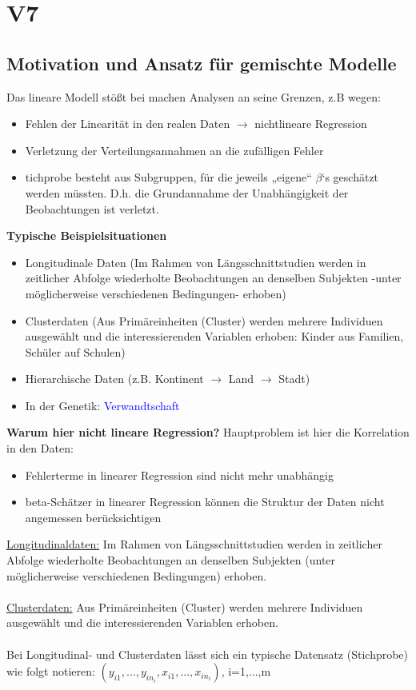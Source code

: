 \section{V7}
\subsection{Motivation und Ansatz für gemischte Modelle}
Das lineare Modell stößt bei machen Analysen an seine Grenzen, z.B wegen:
\begin{itemize}
	\item Fehlen der Linearität in den realen Daten $\rightarrow$ nichtlineare Regression
	\item Verletzung der Verteilungsannahmen an die zufälligen Fehler
	\item tichprobe besteht aus Subgruppen, für die jeweils „eigene“ $\beta$‘s geschätzt werden müssten. D.h. die Grundannahme der Unabhängigkeit der Beobachtungen ist verletzt.
\end{itemize}

\textbf{Typische Beispielsituationen}
\begin{itemize}
	\item Longitudinale Daten (Im Rahmen von Längsschnittstudien werden in zeitlicher Abfolge wiederholte Beobachtungen an denselben Subjekten -unter möglicherweise verschiedenen Bedingungen- erhoben)
	\item Clusterdaten (Aus Primäreinheiten (Cluster) werden mehrere Individuen ausgewählt und die interessierenden Variablen erhoben: Kinder aus Familien, Schüler auf Schulen)
	\item Hierarchische Daten (z.B. Kontinent $\rightarrow$ Land $\rightarrow$ Stadt)
	\item In der Genetik: \textcolor{blue}{Verwandtschaft}
\end{itemize}

\textbf{Warum hier nicht lineare Regression?}
Hauptproblem ist hier die Korrelation in den Daten:
\begin{itemize}
	\item Fehlerterme in linearer Regression sind nicht mehr unabhängig
	\item beta-Schätzer in linearer Regression können die Struktur der Daten nicht angemessen berücksichtigen
\end{itemize}

\underline{Longitudinaldaten:} Im Rahmen von Längsschnittstudien werden in zeitlicher Abfolge wiederholte Beobachtungen an denselben Subjekten (unter möglicherweise verschiedenen Bedingungen) erhoben.
\\\\
\underline{Clusterdaten:} Aus Primäreinheiten (Cluster) werden mehrere Individuen ausgewählt und die interessierenden Variablen erhoben.
\\\\
Bei Longitudinal- und Clusterdaten lässt sich ein typische Datensatz (Stichprobe) wie folgt notieren: $(y_{i1}, ... , y_{in_i}, x_{i1}, ..., x_{in_i})$, i=1,...,m

